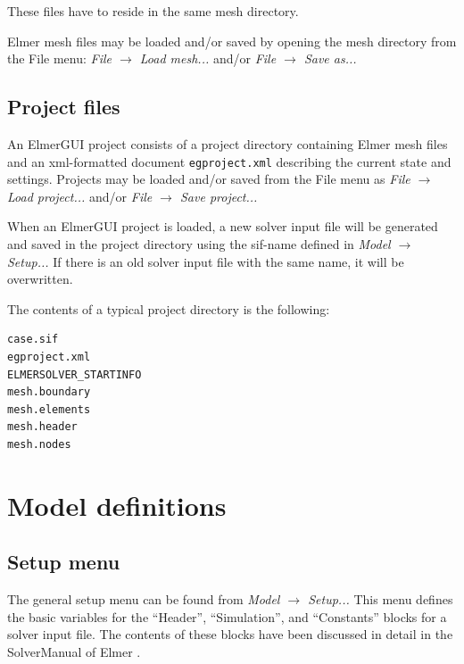 \documentclass[a4paper,12pt]{article}
\newcommand{\menu}[2]{{\it \vskip2mm #1 $\rightarrow$ #2 \vskip2mm}}
\begin{document}
\noindent These files have to reside in the same mesh directory.

Elmer mesh files may be loaded and/or saved by opening the mesh directory from the File menu:
\menu{File}{Load mesh...}
\noindent and/or
\menu{File}{Save as...}

\subsection{Project files}

An ElmerGUI project consists of a project directory containing Elmer mesh files and an xml-formatted 
document {\tt egproject.xml} describing the current state and settings. Projects may be loaded and/or saved from the File menu as
\menu{File}{Load project...}
\noindent and/or
\menu{File}{Save project...}

When an ElmerGUI project is loaded, a new solver input file will be generated and saved
in the project directory using the sif-name defined in
\menu{Model}{Setup...}
\noindent If there is an old solver input file with the same name, it will be overwritten.

The contents of a typical project directory is the following:

\begin{footnotesize}
\begin{verbatim}
case.sif 
egproject.xml
ELMERSOLVER_STARTINFO 
mesh.boundary 
mesh.elements 
mesh.header 
mesh.nodes
\end{verbatim}
\end{footnotesize}

\section{Model definitions}

\subsection{Setup menu}

The general setup menu can be found from
\menu{Model}{Setup...}
\noindent This menu defines the basic variables for the ``Header'', ``Simulation'',
and ``Constants'' blocks for a solver input file. The contents of these blocks have
been discussed in detail in the SolverManual of Elmer \cite{ElmerHome}.
\end{document}
